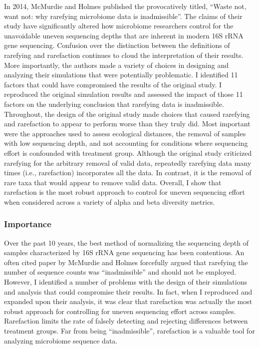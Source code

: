 \documentclass[
]{article}
\begin{document}
In 2014, McMurdie and Holmes published the provocatively titled, ``Waste
not, want not: why rarefying microbiome data is inadmissible''. The
claims of their study have significantly altered how microbiome
researchers control for the unavoidable uneven sequencing depths that
are inherent in modern 16S rRNA gene sequencing. Confusion over the
distinction between the definitions of rarefying and rarefaction
continues to cloud the interpretation of their results. More
importantly, the authors made a variety of choices in designing and
analyzing their simulations that were potentially problematic. I
identified 11 factors that could have compromised the results of the
original study. I reproduced the original simulation results and
assessed the impact of those 11 factors on the underlying conclusion
that rarefying data is inadmissible. Throughout, the design of the
original study made choices that caused rarefying and rarefaction to
appear to perform worse than they truly did. Most important were the
approaches used to assess ecological distances, the removal of samples
with low sequencing depth, and not accounting for conditions where
sequencing effort is confounded with treatment group. Although the
original study criticized rarefying for the arbitrary removal of valid
data, repeatedly rarefying data many times (i.e., rarefaction)
incorporates all the data. In contrast, it is the removal of rare taxa
that would appear to remove valid data. Overall, I show that rarefaction
is the most robust approach to control for uneven sequencing effort when
considered across a variety of alpha and beta diversity metrics.

\hypertarget{importance}{%
\subsubsection{Importance}\label{importance}}

Over the past 10 years, the best method of normalizing the sequencing
depth of samples characterized by 16S rRNA gene sequencing has been
contentious. An often cited paper by McMurdie and Holmes forcefully
argued that rarefying the number of sequence counts was ``inadmissible''
and should not be employed. However, I identified a number of problems
with the design of their simulations and analysis that could compromise
their results. In fact, when I reproduced and expanded upon their
analysis, it was clear that rarefaction was actually the most robust
approach for controlling for uneven sequencing effort across samples.
Rarefaction limits the rate of falsely detecting and rejecting
differences between treatment groups. Far from being ``inadmissible'',
rarefaction is a valuable tool for analyzing microbiome sequence data.
\end{document}
